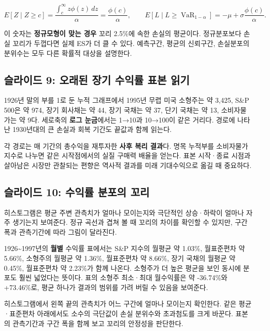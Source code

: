 \documentclass[11pt,a4paper]{article}
\begin{document}
\[
E[Z\mid Z\ge c]
=\frac{\int_c^\infty z\phi(z)\,dz}{\alpha}
=\frac{\phi(c)}{\alpha},\qquad
E[L\mid L\ge\operatorname{VaR}_{1-\alpha}]
=-\mu+\sigma\frac{\phi(c)}{\alpha}.
\]

이 숫자는 \textbf{정규모형이 맞는 경우} 꼬리 2.5\%에 속한 손실의 평균이다. 정규분포보다 손실 꼬리가 두껍다면 실제 ES가 더 클 수 있다. 예측구간, 평균의 신뢰구간, 손실분포의 분위수는 모두 다른 확률적 대상을 설명한다.
\par

\subsection{슬라이드 9: 오래된 장기 수익률 표본 읽기}

1926년 말의 부를 1로 둔 누적 그래프에서 1995년 무렵 미국 소형주는 약 3,425, S\&P 500은 약 974, 장기 회사채는 약 44, 장기 국채는 약 37, 단기 국채는 약 13, 소비자물가는 약 9다. 세로축의 \textbf{로그 눈금}에서는 1→10과 10→100이 같은 거리다. 경로에 나타난 1930년대의 큰 손실과 회복 기간도 끝값과 함께 읽는다.
\par

각 경로는 매 기간의 총수익을 재투자한 \textbf{사후 복리 결과}다. 명목 누적부를 소비자물가 지수로 나누면 같은 시작점에서의 실질 구매력 배율을 얻는다. 표본 시작·종료 시점과 살아남은 시장만 관찰되는 편향은 역사적 결과를 미래 기대수익으로 옮길 때 중요하다.
\par

\subsection{슬라이드 10: 수익률 분포의 꼬리}

히스토그램은 평균 주변 관측치가 얼마나 모이는지와 극단적인 상승·하락이 얼마나 자주 생기는지 보여준다. 정규 곡선과 겹쳐 볼 때 꼬리의 차이를 확인할 수 있지만, 구간 폭과 관측기간에 따라 그림이 달라진다.
\par

1926\textasciitilde{}1997년의 \textbf{월별} 수익률 표에서는 S\&P 지수의 월평균 약 1.03\%, 월표준편차 약 5.66\%, 소형주의 월평균 약 1.36\%, 월표준편차 약 8.66\%, 장기 국채의 월평균 약 0.45\%, 월표준편차 약 2.23\%가 함께 나온다. 소형주가 더 높은 평균을 보인 동시에 분포도 훨씬 넓었다는 뜻이다. 표의 소형주 최소·최대 월수익률은 약 -36.74\%와 +73.46\%로, 평균 하나가 결과의 범위를 가려 버릴 수 있음을 보여준다.
\par

히스토그램에서 왼쪽 끝의 관측치가 어느 구간에 얼마나 모이는지 확인한다. 같은 평균·표준편차 아래에서도 소수의 극단값이 손실 분위수와 초과첨도를 크게 바꾼다. 표본의 관측기간과 구간 폭을 함께 보고 꼬리의 안정성을 판단한다.
\par
\end{document}
